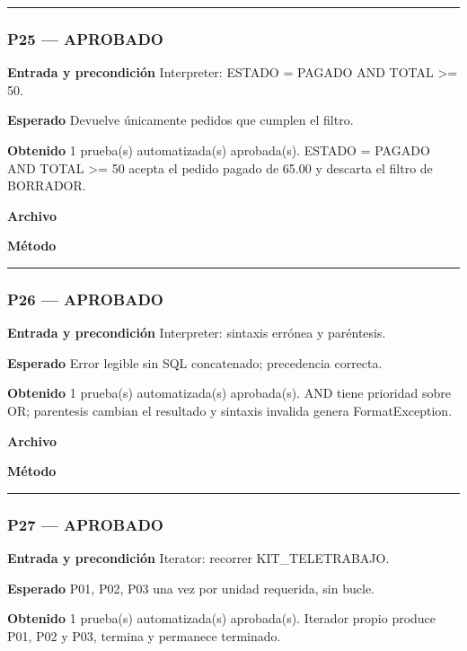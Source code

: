 \medskip\hrule\medskip
\subsubsection*{P25 --- APROBADO}
\textbf{Entrada y precondición} Interpreter: ESTADO = PAGADO AND TOTAL >= 50.

\textbf{Esperado} Devuelve únicamente pedidos que cumplen el filtro.

\textbf{Obtenido} 1 prueba(s) automatizada(s) aprobada(s). ESTADO = PAGADO AND TOTAL >= 50 acepta el pedido pagado de 65.00 y descarta el filtro de BORRADOR.

\textbf{Archivo} \href{https://github.com/Alan77-bot/LogiMarket360Alan/blob/68bda51063441415524ede51bdf61649ee9b4973/tests/LogiMarket.Tests/Patrones/ComportamentalesTests.cs}{}

\textbf{Método} 

\medskip\hrule\medskip
\subsubsection*{P26 --- APROBADO}
\textbf{Entrada y precondición} Interpreter: sintaxis errónea y paréntesis.

\textbf{Esperado} Error legible sin SQL concatenado; precedencia correcta.

\textbf{Obtenido} 1 prueba(s) automatizada(s) aprobada(s). AND tiene prioridad sobre OR; parentesis cambian el resultado y sintaxis invalida genera FormatException.

\textbf{Archivo} \href{https://github.com/Alan77-bot/LogiMarket360Alan/blob/68bda51063441415524ede51bdf61649ee9b4973/tests/LogiMarket.Tests/Patrones/ComportamentalesTests.cs}{}

\textbf{Método} 

\medskip\hrule\medskip
\subsubsection*{P27 --- APROBADO}
\textbf{Entrada y precondición} Iterator: recorrer KIT\_TELETRABAJO.

\textbf{Esperado} P01, P02, P03 una vez por unidad requerida, sin bucle.

\textbf{Obtenido} 1 prueba(s) automatizada(s) aprobada(s). Iterador propio produce P01, P02 y P03, termina y permanece terminado.

